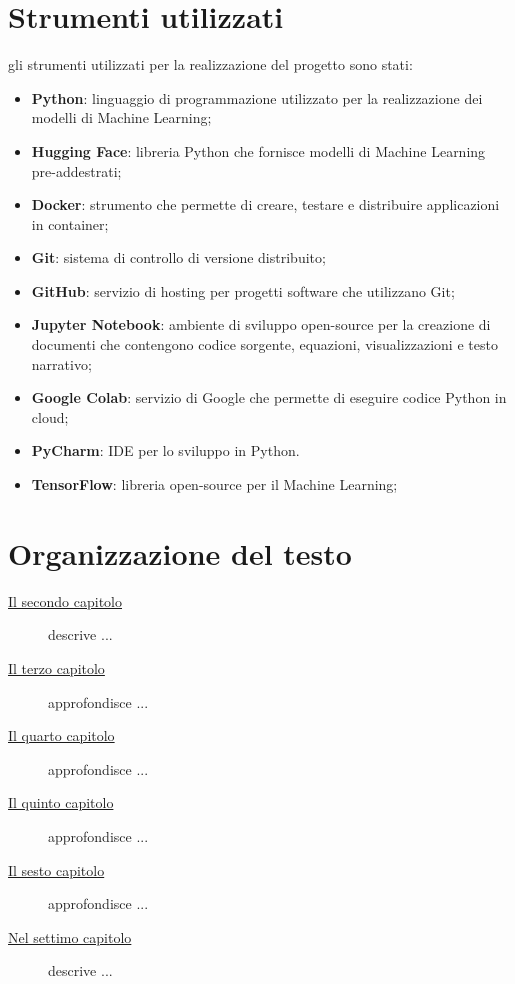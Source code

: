 \section{Strumenti utilizzati}
gli strumenti utilizzati per la realizzazione del progetto sono stati:
\begin{itemize}
    \item \textbf{Python}: linguaggio di programmazione utilizzato per la realizzazione dei modelli di Machine Learning;
    \item \textbf{Hugging Face}: libreria Python che fornisce modelli di Machine Learning pre-addestrati;
    \item \textbf{Docker}: strumento che permette di creare, testare e distribuire applicazioni in container;
    \item \textbf{Git}: sistema di controllo di versione distribuito;
    \item \textbf{GitHub}: servizio di hosting per progetti software che utilizzano Git;
    \item \textbf{Jupyter Notebook}: ambiente di sviluppo open-source per la creazione di documenti che contengono codice sorgente, equazioni, visualizzazioni e testo narrativo;
    \item \textbf{Google Colab}: servizio di Google che permette di eseguire codice Python in cloud;
    \item \textbf{PyCharm}: IDE per lo sviluppo in Python.
    \item \textbf{TensorFlow}: libreria open-source per il Machine Learning;
\end{itemize}

\section{Organizzazione del testo}
\begin{description}
    \item[{\hyperref[chap:processi-metodologie]{Il secondo capitolo}}] descrive ...
    
    \item[{\hyperref[chap:descrizione-stage]{Il terzo capitolo}}] approfondisce ...
    
    \item[{\hyperref[chap:analisi-requisiti]{Il quarto capitolo}}] approfondisce ...
    
    \item[{\hyperref[chap:progettazione-codifica]{Il quinto capitolo}}] approfondisce ...
    
    \item[{\hyperref[chap:verifica-validazione]{Il sesto capitolo}}] approfondisce ...
    
    \item[{\hyperref[chap:conclusioni]{Nel settimo capitolo}}] descrive ...
\end{description}

